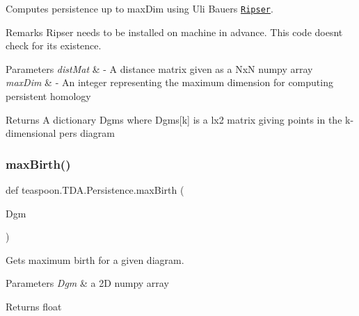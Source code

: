 Computes persistence up to max\+Dim using Uli Bauer\textquotesingle{}s \href{https://github.com/Ripser/ripser}{\tt Ripser}. 

\begin{DoxyRemark}{Remarks}
Ripser needs to be installed on machine in advance. This code doesn\textquotesingle{}t check for it\textquotesingle{}s existence.
\end{DoxyRemark}

\begin{DoxyParams}{Parameters}
{\em dist\+Mat} & -\/ A distance matrix given as a NxN numpy array \\
\hline
{\em max\+Dim} & -\/ An integer representing the maximum dimension for computing persistent homology\\
\hline
\end{DoxyParams}
\begin{DoxyReturn}{Returns}
A dictionary Dgms where Dgms\mbox{[}k\mbox{]} is a lx2 matrix giving points in the k-\/dimensional pers diagram 
\end{DoxyReturn}
\mbox{\label{namespaceteaspoon_1_1_t_d_a_1_1_persistence_aa91a12cbd748fc2f13944fbc653739d1}} 
\subsubsection{\texorpdfstring{max\+Birth()}{maxBirth()}}
{\footnotesize\ttfamily def teaspoon.\+T\+D\+A.\+Persistence.\+max\+Birth (\begin{DoxyParamCaption}\item[{}]{Dgm }\end{DoxyParamCaption})}



Gets maximum birth for a given diagram. 


\begin{DoxyParams}{Parameters}
{\em Dgm} & a 2D numpy array\\
\hline
\end{DoxyParams}
\begin{DoxyReturn}{Returns}
float 
\end{DoxyReturn}
\mbox{\label{namespaceteaspoon_1_1_t_d_a_1_1_persistence_a866a47a538d7042da1de685bed83d00e}} 
